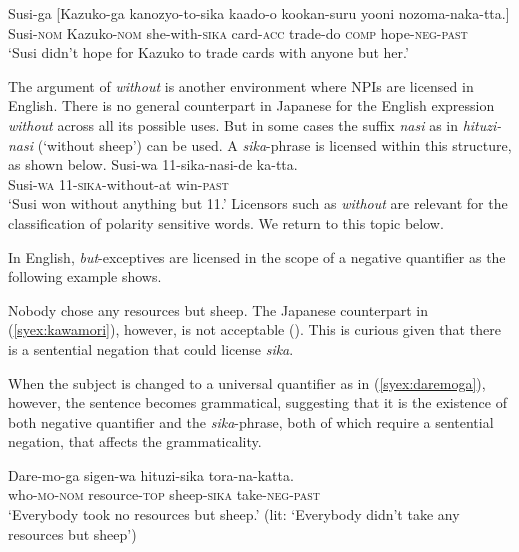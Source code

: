 \documentclass[output=paper]{langscibook}
\begin{document}
\ea \gll Susi-ga [Kazuko-ga kanozyo-to-sika kaado-o kookan-suru yooni nozoma-naka-tta.]\\
Susi-\textsc{nom} Kazuko-\textsc{nom} she-with-\textsc{sika} card-\textsc{acc} trade-do \textsc{comp} hope-\textsc{neg}-\textsc{past}\\
\glt `Susi didn't hope for Kazuko to trade cards with anyone but her.'\z


The argument of \emph{without} is another environment where NPIs are licensed in English.
There is no general counterpart in Japanese for the English expression \textit{without} across all its possible uses.  But in some cases the suffix \emph{nasi} as in \emph{hituzi-nasi} (`without sheep') can be used.  A \emph{sika}-phrase is licensed within this structure, as shown below.
\ea \label{syex:nasi}
    \gll Susi-wa 11-sika-nasi-de ka-tta.\\
        Susi-\textsc{wa} 11-\textsc{sika}-without-at  win-\textsc{past}\\
    \glt    `Susi won without anything but 11.'\z
%       
Licensors such as \emph{without} are relevant for the classification of polarity sensitive words.  We return to this topic below.

In English, \emph{but}-exceptives are licensed in the scope of a negative quantifier as the following example shows. 

\ea Nobody chose any resources but sheep.\z
%
The Japanese counterpart in (\ref{syex:kawamori}), however, is not acceptable (\citealt{kawamori01a}). This is curious given that there is a sentential negation that could license \emph{sika}. 

\z

When the subject is changed to a universal quantifier as in (\ref{syex:daremoga}), however, the sentence becomes grammatical, suggesting that it is the existence of both negative quantifier and the \emph{sika}-phrase, both of which require a sentential negation, that affects the grammaticality.

\ea \label{syex:daremoga}
\gll Dare-mo-ga sigen-wa hituzi-sika tora-na-katta.\\
who-\textsc{mo}-\textsc{nom} resource-\textsc{top} sheep-\textsc{sika} take-\textsc{neg-past}\\
\glt `Everybody took no resources but sheep.' (lit: `Everybody didn't take any resources but sheep')\z
\end{document}
